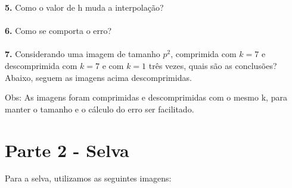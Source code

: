 \documentclass[12pt,letterpaper]{article}
\begin{document}
	\textbf{5.} Como o valor de h muda a interpolação? \\
	\\
	
	\textbf{6.} Como se comporta o erro?\\
	\\
	
	\textbf{7.} Considerando uma imagem de tamanho $p^2$, comprimida com $k = 7$ e descomprimida com $k = 7$ e com $k = 1$ três vezes, quais são as conclusões?\\
	
	Abaixo, seguem as imagens acima descomprimidas.
	
	\begin{figure}[h]
	\end{figure}
	
	\clearpage
	
	\begin{figure}[h]
	\end{figure}
	
	\begin{figure}[h]
	\end{figure}
	
	Obs: As imagens foram comprimidas e descomprimidas com o mesmo k, para manter o tamanho e o cálculo do erro ser facilitado.
	
	\section{Parte 2 - Selva}
	
	Para a selva, utilizamos as seguintes imagens:
	\clearpage
	
\end{document}
